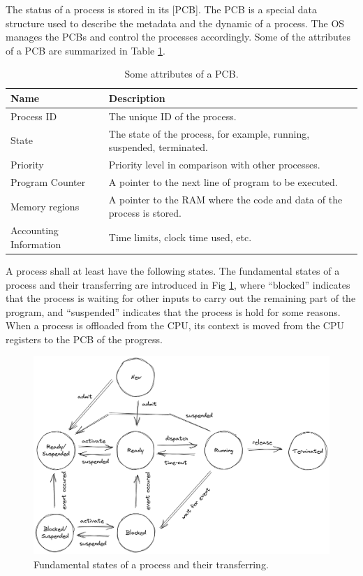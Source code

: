 The status of a process is stored in its [PCB]. The PCB is a special data structure used to describe the metadata and the dynamic of a process. The OS manages the PCBs and control the processes accordingly. Some of the attributes of a PCB are summarized in Table \ref{ch:pm:tab:pcbcontent}.

\begin{table}[!htb]
	\centering \caption{Some attributes of a PCB.}\label{ch:pm:tab:pcbcontent}
	\begin{tabularx}{\textwidth}{lX}
		\hline
		Name & Description \\ \hline
		Process ID & The unique ID of the process.  \\
		State & The state of the process, for example, running, suspended, terminated.  \\
		Priority & Priority level in comparison with other processes. \\
		Program Counter & A pointer to the next line of program to be executed. \\
		Memory regions & A pointer to the RAM where the code and data of the process is stored. \\
		Accounting Information & Time limits, clock time used, etc. \\ \hline
	\end{tabularx}
\end{table}

A process shall at least have the following states. The fundamental states of a process and their transferring are introduced in Fig \ref{ch:pm:fig:processstatetransfer}, where ``blocked'' indicates that the process is waiting for other inputs to carry out the remaining part of the program, and ``suspended'' indicates that the process is hold for some reasons. When a process is offloaded from the CPU, its context is moved from the CPU registers to the PCB of the progress.

\begin{figure}[!htb]
	\centering
	\includegraphics[width=350pt]{chapters/part-1/figures/processstatetransfer.png}
	\caption{Fundamental states of a process and their transferring.} \label{ch:pm:fig:processstatetransfer}
\end{figure}

